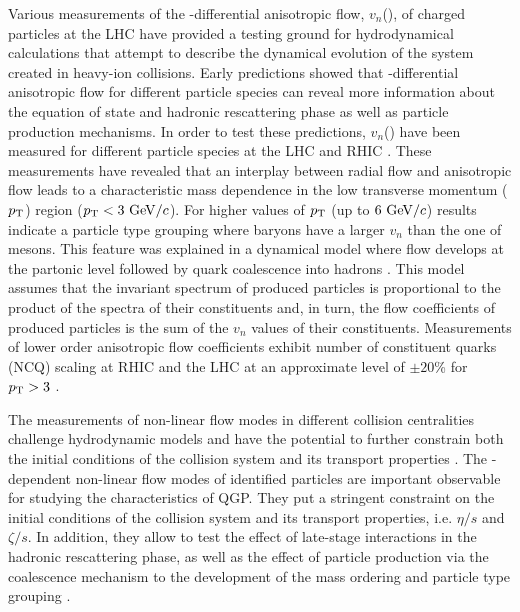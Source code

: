 Various measurements of the \pT-differential anisotropic flow, $v_{n}$(\pT), of charged particles at the LHC \cite{ALICE:2011ab, ATLAS:2012at, Chatrchyan:2013kba, Acharya:2018lmh,Acharya:2018ihu} have provided a testing ground for hydrodynamical calculations that attempt to describe the dynamical evolution of the system created in heavy-ion collisions. Early predictions showed that \pT-differential anisotropic flow for different particle species can reveal more information about the equation of state and hadronic rescattering phase \cite{Voloshin:1996nv,Huovinen:2001cy} as well as particle production mechanisms. In order to test these predictions, $v_{n}$(\pT) have been measured for different particle species at the LHC \cite{Abelev:2014pua,Adam:2015eta,Adam:2016nfo,Acharya:2018zuq} and RHIC \cite{Adams:2003am,Abelev:2007qg,Adler:2003kt,Adare:2006ti}. These measurements have revealed that an interplay between radial flow and anisotropic flow leads to a characteristic mass dependence in the low transverse momentum ($p_{\rm{T}}$) region ($p_{\rm{T}} < 3~{\rm GeV}/c$). For higher values of $p_{\rm{T}}$ (up to $6~{\rm GeV}/c$) results indicate a particle type grouping where baryons have a larger $v_{n}$ than the one of mesons. This feature was explained in a dynamical model where flow develops at the partonic level followed by quark coalescence into hadrons \cite{Voloshin:2002wa,Molnar:2003ff}. This model assumes that the invariant spectrum of produced particles is proportional to the product of the spectra of their constituents and, in turn, the flow coefficients of produced particles is the sum of the $v_{n}$ values of their constituents. Measurements of lower order anisotropic flow coefficients exhibit number of constituent quarks (NCQ) scaling at RHIC \cite{Adare:2012vq} and the LHC \cite{Abelev:2014pua,Adam:2016nfo} at an approximate level of $\pm20$\% for $p_{\rm{T}} > 3$ \GeV.

The measurements of non-linear flow modes in different collision centralities challenge hydrodynamic models and have the potential to further constrain both the initial conditions of the collision system and its transport properties \cite{Zhu:2016puf, Acharya:2017zfg}. The \pT-dependent non-linear flow modes of identified particles are important observable for studying the characteristics of QGP. They put a stringent constraint on the initial conditions of the collision system and its transport properties, i.e. $\eta/s$ and $\zeta/s$. In addition, they allow to test the effect of late-stage interactions in the hadronic rescattering phase, as well as the effect of particle production via the coalescence mechanism to the development of the mass ordering and particle type grouping \cite{ALICE:2011ab,Acharya:2018zuq}.


